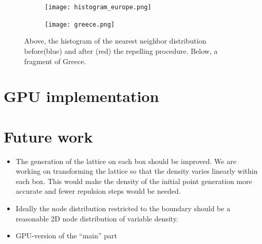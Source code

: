 \documentclass[10pt]{amsart}
\begin{document}
\begin{figure}[h!]
	\centering
	\begin{subfigure}{\linewidth}
	\texttt{[image: histogram\_europe.png]}
	\end{subfigure}
	\begin{subfigure}{\linewidth}
	\texttt{[image: greece.png]}
	\end{subfigure}
	\caption{Above, the histogram of the nearest neighbor distribution before(blue) and after (red) the repelling procedure. Below, a fragment of Greece.} 
	\label{fig:mult}
\end{figure}

\section{GPU implementation}



\section{Future work}

\begin{itemize}
\item The generation of the lattice on each box should be improved. We are working on transforming the lattice so that the density varies linearly within each box. This would make the density of the initial point generation more accurate and fewer repulsion steps would be needed.
\item Ideally the node distribution restricted to the boundary should be a reasonable 2D node distribution of variable density.
\item GPU-version of the ``main'' part \cite{Recipes1989}
\end{itemize}



\end{document}
